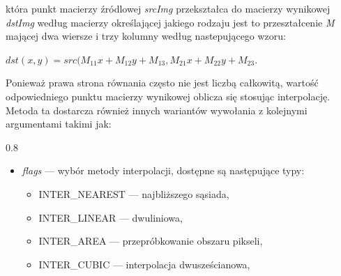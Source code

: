 \documentclass[a4paper,12pt]{article}
\newcommand\spacingInSimpleItemize{0.8}
\newcommand\spacingInSolemnItemize{1.2}
\begin{document}
		        która punkt macierzy źródlowej \textit{srcImg} przekształca do macierzy wynikowej \textit{dstImg} według macierzy określającej jakiego rodzaju jest to przeształcenie \textit{M} mającej dwa wiersze i trzy kolumny według nastepującego wzoru:
                \begin{center}
                    \textit{$dst(x,y) = src( M_{11} x + M_{12} y + M_{13}, M_{21} x + M_{22} y + M_{23}$}.
                \end{center} \par    
                Ponieważ prawa strona równania często nie jest liczbą całkowitą, wartość odpowiedniego punktu macierzy wynikowej oblicza się stosując interpolację. Metoda ta dostarcza również innych wariantów wywołania z kolejnymi argumentami takimi jak: 
                \newpage
                \begin{spacing}{\spacingInSimpleItemize}
                \begin{itemize}
                    \item \textit{flags} --- wybór metody interpolacji, 
                    dostępne są następujące typy:\\
                   
                    \begin{itemize}
                    \item INTER\_NEAREST --- najbliższego sąsiada,\\ 
                    \item INTER\_LINEAR --- dwuliniowa,\\
                    \item INTER\_AREA --- przepróbkowanie obszaru pikseli,\\
                    \item INTER\_CUBIC --- interpolacja dwusześcianowa,\\
                    \end{itemize}
                    

\end{itemize}
\end{spacing}
\end{document}
